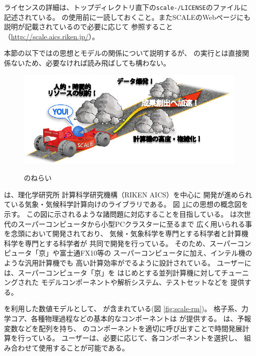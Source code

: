 ライセンスの詳細は、トップディレクトリ直下の\texttt{scale-\version/LICENSE}のファイルに記述されている。
\scalelib の使用前に一読しておくこと。またSCALEのWebページにも説明が記載されているので必要に応じて
参照すること（\url{http://scale.aics.riken.jp/}）。

本節の以下では\scalelib の思想とモデルの関係について説明するが、
\scalerm の実行とは直接関係ないため、必要なければ読み飛ばしても構わない。


\begin{figure}[htb]
\begin{center}
  \includegraphics[width=0.9\hsize]{./figure/library.eps}\\
  \caption{\scalelib のねらい}
  \label{fig:scale}
\end{center}
\end{figure}

\scalelib は、理化学研究所 計算科学研究機構（RIKEN AICS）を中心に
開発が進められている気象・気候科学計算向けのライブラリである。
図 \ref{fig:scale}に\scalelib の思想の概念図を示す。
この図に示されるような諸問題に対応することを目指している。
\scalelib は次世代のスーパーコンピュータから小型PCクラスターに至るまで
広く用いられる事を念頭において開発されており、
気候・気象科学を専門とする科学者と計算機科学を専門とする科学者が
共同で開発を行っている。
そのため、スーパーコンピュータ「京」や富士通FX10等の
スーパーコンピュータに加え、インテル機のような汎用計算機でも
高い計算効率がでるように設計されている。
ユーザーには、スーパーコンピュータ「京」を
はじめとする並列計算機に対してチューニングされた
モデルコンポーネントや解析システム、テストセットなどを
提供する。


\scalelib を利用した数値モデルとして、
\scalerm が含まれている(図 \ref{fig:scale-rm})。
格子系、力学コア、各種物理過程などの基本的なコンポーネントは
\scalelib が提供する。
\scalerm は、予報変数などを配列を持ち、
\scalelib のコンポーネントを適切に呼び出すことで時間発展計算を行っている。
ユーザーは、必要に応じて、各コンポーネントを選択し、
組み合わせて使用することが可能である。


